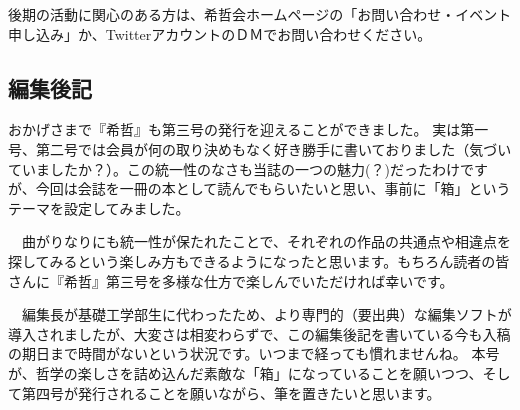 \documentclass[b5j,twoside,twocolumn]{utarticle}
\begin{document}
後期の活動に関心のある方は、希哲会ホームページの「お問い合わせ・イベント申し込み」か、TwitterアカウントのＤＭでお問い合わせください。

\subsection*{編集後記}
おかげさまで『希哲』も第三号の発行を迎えることができました。
実は第一号、第二号では会員が何の取り決めもなく好き勝手に書いておりました（気づいていましたか？）。この統一性のなさも当誌の一つの魅力(？)だったわけですが、今回は会誌を一冊の本として読んでもらいたいと思い、事前に「箱」というテーマを設定してみました。


~~曲がりなりにも統一性が保たれたことで、それぞれの作品の共通点や相違点を探してみるという楽しみ方もできるようになったと思います。もちろん読者の皆さんに『希哲』第三号を多様な仕方で楽しんでいただければ幸いです。 


~~編集長が基礎工学部生に代わったため、より専門的（要出典）な編集ソフトが導入されましたが、大変さは相変わらずで、この編集後記を書いている今も入稿の期日まで時間がないという状況です。いつまで経っても慣れませんね。 
本号が、哲学の楽しさを詰め込んだ素敵な「箱」になっていることを願いつつ、そして第四号が発行されることを願いながら、筆を置きたいと思います。
\end{document}
